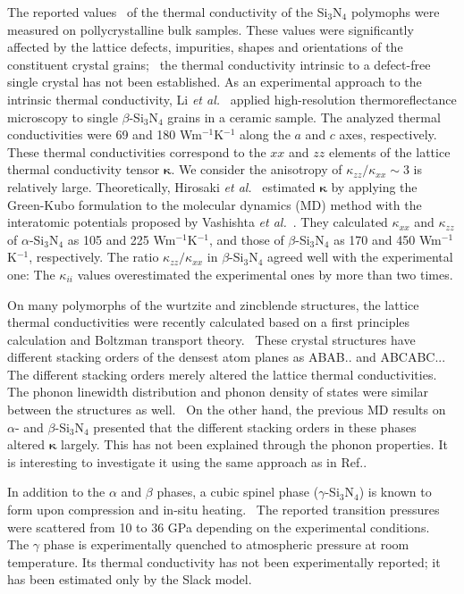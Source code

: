 \documentclass[twocolumn,amsmath,amssymb,a4paper,prb,superscriptaddress,floatfix]{revtex4-1}
\begin{document}
The reported values~\cite{zhou,hirao-rev,watari,hirosaki,hirai} of the thermal
conductivity of the Si$_3$N$_4$ polymophs were measured on pollycrystalline bulk
samples. These values were significantly affected by the lattice defects,
impurities, shapes and orientations of the constituent crystal
grains;~\cite{hirosaki-md} the thermal conductivity intrinsic to a defect-free
single crystal has not been established. As an experimental approach to the
intrinsic thermal conductivity, Li {\it et al.}~\cite{li} applied
high-resolution thermoreflectance microscopy to single $\beta$-Si$_3$N$_4$
grains in a ceramic sample. The analyzed thermal conductivities were 69 and 180
Wm$^{-1}$K$^{-1}$ along the $a$ and $c$ axes, respectively.  These thermal
conductivities correspond to the $xx$ and $zz$ elements of the lattice thermal
conductivity tensor $\boldsymbol{\kappa}$. We consider the anisotropy of
$\kappa_{zz}/\kappa_{xx}\sim 3$ is relatively large.  Theoretically, Hirosaki
{\it et al.}~\cite{hirosaki-md} estimated $\boldsymbol{\kappa}$ by applying the
Green-Kubo formulation to the molecular dynamics (MD) method with the
interatomic potentials proposed by Vashishta {\it et al.}~\cite{vashishta}.
They calculated $\kappa$$_{xx}$ and $\kappa$$_{zz}$ of $\alpha$-Si$_3$N$_4$ as
105 and 225 Wm$^{-1}$K$^{-1}$, and those of $\beta$-Si$_3$N$_4$ as 170 and 450
Wm$^{-1}$K$^{-1}$, respectively.  The ratio $\kappa_{zz}/\kappa_{xx}$ in
$\beta$-Si$_3$N$_4$ agreed well with the experimental one: The $\kappa_{ii}$
values overestimated the experimental ones by more than two times. 

On many polymorphs of the wurtzite and zincblende structures, the lattice
thermal conductivities were recently calculated based on a first principles
calculation and Boltzman transport theory.~\cite{phono3py}  These crystal
structures
have different stacking orders of the densest atom planes as ABAB.. and
ABCABC...  The different stacking orders merely altered the lattice thermal
conductivities.~\cite{phono3py} The phonon linewidth distribution and phonon
density of states were similar between the structures as well.~\cite{phono3py}
On the other hand, the previous MD results on $\alpha$- and
$\beta$-Si$_3$N$_4$ presented that the different stacking orders in these
phases altered $\boldsymbol{\kappa}$ largely. This
has not been explained through the phonon properties.
It is interesting to investigate it using the same approach as in
Ref..

In addition to the $\alpha$ and $\beta$ phases, a cubic spinel phase
($\gamma$-Si$_3$N$_4$) is known to form upon compression and in-situ
heating.~\cite{zerr,zhang} The reported transition pressures were scattered from
10 to 36 GPa depending on the experimental conditions.~\cite{xu}  The $\gamma$
phase is experimentally quenched to atmospheric pressure at room temperature.
Its thermal conductivity has not been experimentally reported; it has been
estimated only by the Slack model.~\cite{morelli} 
\end{document}
